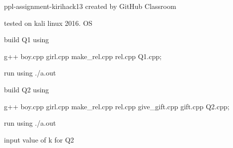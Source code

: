 ppl-\/assignment-\/kirihack13 created by Git\+Hub Classroom

tested on kali linux 2016. OS

build Q1 using \begin{DoxyVerb}  g++ boy.cpp girl.cpp make_rel.cpp rel.cpp Q1.cpp;
\end{DoxyVerb}


run using ./a.out

build Q2 using \begin{DoxyVerb}  g++ boy.cpp girl.cpp make_rel.cpp rel.cpp give_gift.cpp gift.cpp Q2.cpp;
\end{DoxyVerb}


run using ./a.out

input value of k for Q2 